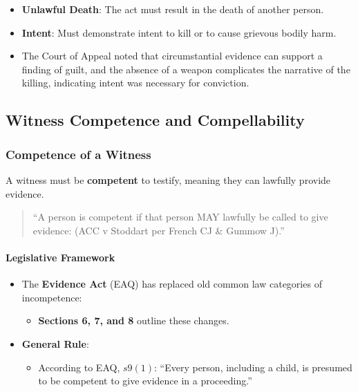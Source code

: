 \begin{itemize}
\item
  \textbf{Unlawful Death}: The act must result in the death of another
  person.
\item
  \textbf{Intent}: Must demonstrate intent to kill or to cause grievous
  bodily harm.
\item
  The Court of Appeal noted that circumstantial evidence can support a
  finding of guilt, and the absence of a weapon complicates the
  narrative of the killing, indicating intent was necessary for
  conviction.
\end{itemize}

\subsection{  Witness Competence and
Compellability}\label{witness-competence-and-compellability}

\subsubsection{Competence of a Witness}\label{competence-of-a-witness}

A witness must be \textbf{competent} to testify, meaning they can
lawfully provide evidence.

\begin{quote}
``A person is competent if that person MAY lawfully be called to give
evidence: (ACC v Stoddart per French CJ \& Gummow J).''
\end{quote}

\paragraph{Legislative Framework}\label{legislative-framework}

\begin{itemize}
\tightlist
\item
  The \textbf{Evidence Act} (EAQ) has replaced old common law categories
  of incompetence:

  \begin{itemize}
  \tightlist
  \item
    \textbf{Sections 6, 7, and 8} outline these changes.
  \end{itemize}
\item
  \textbf{General Rule}:

  \begin{itemize}
  \tightlist
  \item
    According to EAQ, \(s9(1)\): ``Every person, including a child, is
    presumed to be competent to give evidence in a proceeding.''
  \end{itemize}
\end{itemize}

